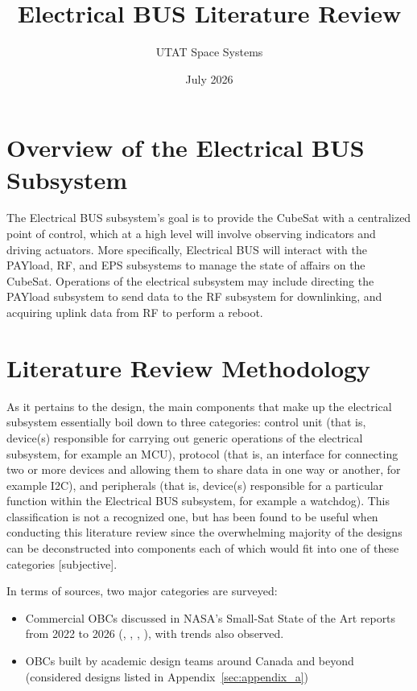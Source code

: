 \documentclass[10pt]{../datasheet}
\title{Electrical BUS Literature Review}
\author{UTAT Space Systems}
\date{July 2026}
\let\cite\citep
\begin{document}
\maketitle
\section{Overview of the Electrical BUS Subsystem}

The Electrical BUS subsystem's goal is to provide the CubeSat with a centralized
point of control, which at a high level will involve observing indicators and
driving actuators. More specifically, Electrical BUS will interact with the
PAYload, RF, and EPS subsystems to manage the state of affairs on the CubeSat.
Operations of the electrical subsystem may include directing the PAYload
subsystem to send data to the RF subsystem for downlinking, and acquiring uplink
data from RF to perform a reboot.


\section{Literature Review Methodology}

As it pertains to the design, the main components that make up the electrical
subsystem essentially boil down to three categories: control unit (that is,
device(s) responsible for carrying out generic operations of the electrical
subsystem, for example an MCU), protocol (that is, an interface for connecting
two or more devices and allowing them to share data in one way or another, for
example I2C), and peripherals (that is, device(s) responsible for a particular
function within the Electrical BUS subsystem, for example a watchdog). This
classification is not a recognized one, but has been found to be useful when
conducting this literature review since the overwhelming majority of the designs
can be deconstructed into components each of which would fit into one of these
categories [subjective].

In terms of sources, two major categories are surveyed:
\begin{itemize}
  \item Commercial OBCs discussed in NASA's Small-Sat State of the Art reports from 2022 to 2026 (\cite[pp.~215--226]{nasa_soa_2022}, \cite[pp.~225--237]{nasa_soa_2023}, \cite[pp.~227--239]{nasa_soa_2024}, \cite[pp.~241--253]{nasa_soa_2026}), with trends also observed.
  \item OBCs built by academic design teams around Canada and beyond (considered
        designs listed in Appendix~\ref{sec:appendix_a})
\end{itemize}
\end{document}
